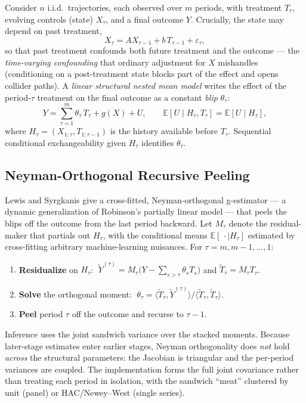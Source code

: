 Consider $n$ i.i.d.\ trajectories, each observed over $m$ periods, with treatment $T_\tau$, evolving controls (state) $X_\tau$, and a final outcome $Y$. Crucially, the state may depend on past treatment,
\[
  X_\tau = A X_{\tau-1} + b\,T_{\tau-1} + \varepsilon_\tau,
\]
so that past treatment confounds both future treatment and the outcome --- the \emph{time-varying confounding} that ordinary adjustment for $X$ mishandles (conditioning on a post-treatment state blocks part of the effect and opens collider paths). A \emph{linear structural nested mean model} writes the effect of the period-$\tau$ treatment on the final outcome as a constant \emph{blip} $\theta_\tau$:
\[
  Y = \sum_{\tau=1}^{m} \theta_\tau\, T_\tau + g(X) + U,
  \qquad \mathbb{E}[U \mid H_\tau, T_\tau] = \mathbb{E}[U \mid H_\tau],
\]
where $H_\tau = (X_{1:\tau}, T_{1:\tau-1})$ is the history available before $T_\tau$. Sequential conditional exchangeability given $H_\tau$ identifies $\theta_\tau$.

\subsection{Neyman-Orthogonal Recursive Peeling}

Lewis and Syrgkanis give a cross-fitted, Neyman-orthogonal g-estimator --- a dynamic generalization of Robinson's partially linear model --- that peels the blips off the outcome from the last period backward. Let $M_\tau$ denote the residual-maker that partials out $H_\tau$, with the conditional means $\mathbb{E}[\,\cdot \mid H_\tau]$ estimated by cross-fitting arbitrary machine-learning nuisances. For $\tau = m, m-1, \dots, 1$:
\begin{enumerate}
    \item \textbf{Residualize} on $H_\tau$: $\;\tilde{Y}^{(\tau)} = M_\tau\!\big(Y - \sum_{s>\tau} \theta_s T_s\big)$ and $\tilde{T}_\tau = M_\tau T_\tau$.
    \item \textbf{Solve} the orthogonal moment: $\;\theta_\tau = \langle \tilde{T}_\tau, \tilde{Y}^{(\tau)} \rangle / \langle \tilde{T}_\tau, \tilde{T}_\tau \rangle$.
    \item \textbf{Peel} period $\tau$ off the outcome and recurse to $\tau-1$.
\end{enumerate}
Inference uses the joint sandwich variance over the stacked moments. Because later-stage estimates enter earlier stages, Neyman orthogonality does \emph{not} hold \emph{across} the structural parameters: the Jacobian is triangular and the per-period variances are coupled. The implementation forms the full joint covariance rather than treating each period in isolation, with the sandwich ``meat'' clustered by unit (panel) or HAC/Newey--West (single series).

